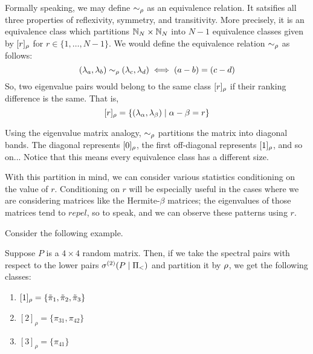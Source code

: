 \begin{remark}
Formally speaking, we may define $\sim_{\rho}$ as an equivalence relation. It satsifies all three properties of reflexivity, symmetry, and transitivity. More precisely, it is an equivalence class which partitions $\mathbb{N}_N \times \mathbb{N}_N$ into $N - 1$ equivalence classes given by $[r]_{\rho}$ for $r \in \{1, \dots, N-1\}$. We would define the equivalence relation $\sim_{\rho}$ as follows:
$$(\lambda_a,\lambda_b) \sim_{\rho} (\lambda_c,\lambda_d) \iff (a -b) = (c-d)$$
So, two eigenvalue pairs would belong to the same class $[r]_{\rho}$ if their ranking difference is the same. That is,
$$[r]_{\rho} = \{(\lambda_\alpha, \lambda_\beta) \mid \alpha - \beta = r\}$$
\end{remark}

\begin{remark}
Using the eigenvalue matrix analogy, $\sim_{\rho}$ partitions the matrix into diagonal bands. The diagonal represents $[0]_{\rho}$, the first off-diagonal represents $[1]_{\rho}$, and so on... Notice that this means every equivalence class has a different size.
\end{remark}

With this partition in mind, we can consider various statistics conditioning on the value of $r$. Conditioning on $r$ will be especially useful in the cases where we are considering matrices like the Hermite-$\beta$ matrices; the eigenvalues of those matrices tend to $\textit{repel}$, so to speak, and we can observe these patterns using $r$.

Consider the following example.

\begin{example}
Suppose $P$ is a $4 \times 4$ random matrix. Then, if we take the spectral pairs with respect to the lower pairs ${\sigma^{(2)}}(P \mid \Pi_<)$ and partition it by ${\rho}$, we get the following classes:
\begin{enumerate}
  \item $[1]_\rho = \{{\tilde{\pi}}_1, {\tilde{\pi}}_2, {\tilde{\pi}}_3\}$
  \item $[2]_\rho = \{\pi_{31}, \pi_{42}\}$
  \item $[3]_\rho = \{\pi_{41}\}$
\end{enumerate}
\end{example}



